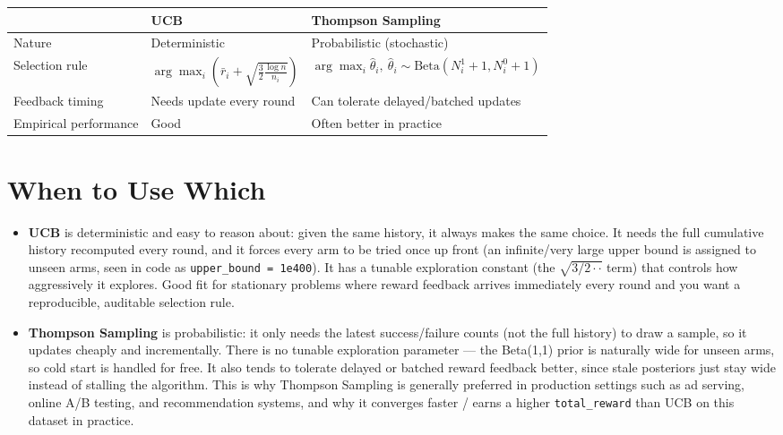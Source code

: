 \documentclass[11pt]{article}
\begin{document}
\begin{center}
\begin{tabular}{|l|l|l|}
\hline
& \textbf{UCB} & \textbf{Thompson Sampling} \\
\hline
Nature & Deterministic & Probabilistic (stochastic) \\
\hline
Selection rule & $\arg\max_i \left(\bar r_i + \sqrt{\tfrac{3}{2}\tfrac{\log n}{n_i}}\right)$
    & $\arg\max_i \hat\theta_i,\ \hat\theta_i \sim \text{Beta}(N_i^1+1, N_i^0+1)$ \\
\hline
Feedback timing & Needs update every round & Can tolerate delayed/batched updates \\
\hline
Empirical performance & Good & Often better in practice \\
\hline
\end{tabular}
\end{center}

\section{When to Use Which}

\begin{itemize}
    \item \textbf{UCB} is deterministic and easy to reason about: given the
        same history, it always makes the same choice. It needs the full
        cumulative history recomputed every round, and it forces every arm
        to be tried once up front (an infinite/very large upper bound is
        assigned to unseen arms, seen in code as
        \texttt{upper\_bound = 1e400}). It has a tunable exploration
        constant (the $\sqrt{3/2 \cdot \cdot}$ term) that controls how
        aggressively it explores. Good fit for stationary problems where
        reward feedback arrives immediately every round and you want a
        reproducible, auditable selection rule.
    \item \textbf{Thompson Sampling} is probabilistic: it only needs the
        latest success/failure counts (not the full history) to draw a
        sample, so it updates cheaply and incrementally. There is no
        tunable exploration parameter --- the Beta(1,1) prior is naturally
        wide for unseen arms, so cold start is handled for free. It also
        tends to tolerate delayed or batched reward feedback better, since
        stale posteriors just stay wide instead of stalling the algorithm.
        This is why Thompson Sampling is generally preferred in production
        settings such as ad serving, online A/B testing, and
        recommendation systems, and why it converges faster / earns a
        higher \texttt{total\_reward} than UCB on this dataset in practice.
\end{itemize}
\end{document}

